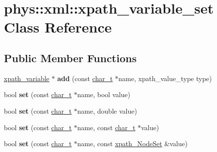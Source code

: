 \hypertarget{classphys_1_1xml_1_1xpath__variable__set}{
\section{phys::xml::xpath\_\-variable\_\-set Class Reference}
\label{d8/d65/classphys_1_1xml_1_1xpath__variable__set}
}
\subsection*{Public Member Functions}
\begin{DoxyCompactItemize}
\item 
\hypertarget{classphys_1_1xml_1_1xpath__variable__set_a4fda302b6bddffabbe60c0478d358b33}{
\hyperlink{classphys_1_1xml_1_1xpath__variable}{xpath\_\-variable} $\ast$ {\bfseries add} (const \hyperlink{namespacephys_1_1xml_afc87705cd1c2917d87b879715a2d8f6e}{char\_\-t} $\ast$name, xpath\_\-value\_\-type type)}
\label{d8/d65/classphys_1_1xml_1_1xpath__variable__set_a4fda302b6bddffabbe60c0478d358b33}

\item 
\hypertarget{classphys_1_1xml_1_1xpath__variable__set_a9d618a1a15bfbace2c323098a8b43836}{
bool {\bfseries set} (const \hyperlink{namespacephys_1_1xml_afc87705cd1c2917d87b879715a2d8f6e}{char\_\-t} $\ast$name, bool value)}
\label{d8/d65/classphys_1_1xml_1_1xpath__variable__set_a9d618a1a15bfbace2c323098a8b43836}

\item 
\hypertarget{classphys_1_1xml_1_1xpath__variable__set_a13e7fc9ce7c2b60abce0fed5ad482783}{
bool {\bfseries set} (const \hyperlink{namespacephys_1_1xml_afc87705cd1c2917d87b879715a2d8f6e}{char\_\-t} $\ast$name, double value)}
\label{d8/d65/classphys_1_1xml_1_1xpath__variable__set_a13e7fc9ce7c2b60abce0fed5ad482783}

\item 
\hypertarget{classphys_1_1xml_1_1xpath__variable__set_a1ef12146849262ce612fe03f89f92d61}{
bool {\bfseries set} (const \hyperlink{namespacephys_1_1xml_afc87705cd1c2917d87b879715a2d8f6e}{char\_\-t} $\ast$name, const \hyperlink{namespacephys_1_1xml_afc87705cd1c2917d87b879715a2d8f6e}{char\_\-t} $\ast$value)}
\label{d8/d65/classphys_1_1xml_1_1xpath__variable__set_a1ef12146849262ce612fe03f89f92d61}

\item 
\hypertarget{classphys_1_1xml_1_1xpath__variable__set_a22067eb7d4bb1e0ea7725362306c5ed5}{
bool {\bfseries set} (const \hyperlink{namespacephys_1_1xml_afc87705cd1c2917d87b879715a2d8f6e}{char\_\-t} $\ast$name, const \hyperlink{classphys_1_1xml_1_1xpath__NodeSet}{xpath\_\-NodeSet} \&value)}
\label{d8/d65/classphys_1_1xml_1_1xpath__variable__set_a22067eb7d4bb1e0ea7725362306c5ed5}


\end{DoxyCompactItemize}
